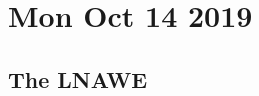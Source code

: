 \documentclass[main.tex]{subfiles}
\begin{document}
\section*{Mon Oct 14 2019}



\subsection{The LNAWE}
\end{document}
